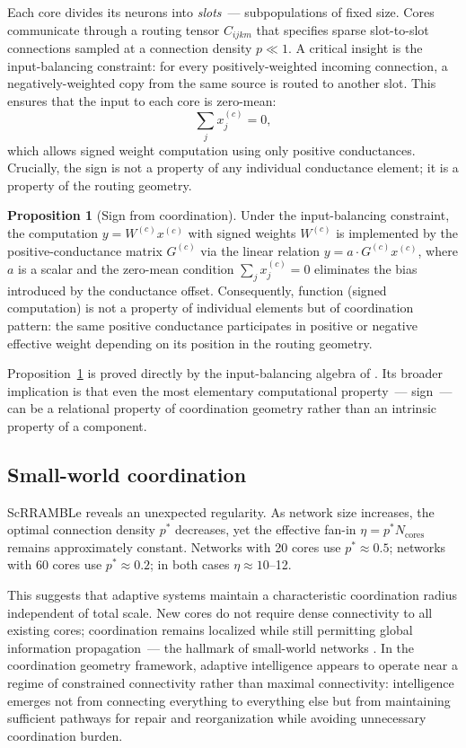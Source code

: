 \documentclass[11pt, a4paper]{article}
\theoremstyle{definition}
\newtheorem{proposition}{Proposition}
\theoremstyle{remark}
\begin{document}
Each core divides its neurons into \textit{slots}~--- subpopulations of
fixed size. Cores communicate through a routing tensor $C_{ijkm}$ that
specifies sparse slot-to-slot connections sampled at a connection density
$p \ll 1$. A critical insight is the input-balancing constraint: for every
positively-weighted incoming connection, a negatively-weighted copy from
the same source is routed to another slot. This ensures that the input to
each core is zero-mean:
\[
\sum_j x_j^{(c)} = 0,
\]
which allows signed weight computation using only positive conductances.
Crucially, the sign is not a property of any individual conductance element;
it is a property of the routing geometry.

\begin{proposition}[Sign from coordination]
\label{prop:sign}
Under the input-balancing constraint, the computation
$y = W^{(c)} x^{(c)}$
with signed weights $W^{(c)}$ is implemented by the positive-conductance
matrix $G^{(c)}$ via the linear relation $y = a \cdot G^{(c)} x^{(c)}$,
where $a$ is a scalar and the zero-mean condition
$\sum_j x_j^{(c)} = 0$
eliminates the bias introduced by the conductance offset.
Consequently, function (signed computation) is not a property of
individual elements but of coordination pattern: the same positive
conductance participates in positive or negative effective weight depending
on its position in the routing geometry.
\end{proposition}

Proposition~\ref{prop:sign} is proved directly by the input-balancing
algebra of \cite{jaltare2026}. Its broader implication is that even the
most elementary computational property~--- sign~--- can be a relational
property of coordination geometry rather than an intrinsic property of a
component.

\subsection*{Small-world coordination}

ScRRAMBLe reveals an unexpected regularity. As network size increases,
the optimal connection density $p^*$ decreases, yet the effective fan-in
$\eta = p^* N_{\mathrm{cores}}$ remains approximately constant. Networks
with 20 cores use $p^* \approx 0.5$; networks with 60 cores use
$p^* \approx 0.2$; in both cases $\eta \approx 10$--12.

This suggests that adaptive systems maintain a characteristic coordination
radius independent of total scale. New cores do not require dense
connectivity to all existing cores; coordination remains localized while
still permitting global information propagation~--- the hallmark of
small-world networks \cite{watts1998, bassett2006}. In the coordination
geometry framework, adaptive intelligence appears to operate near a regime
of constrained connectivity rather than maximal connectivity: intelligence
emerges not from connecting everything to everything else but from
maintaining sufficient pathways for repair and reorganization while
avoiding unnecessary coordination burden.
\end{document}
